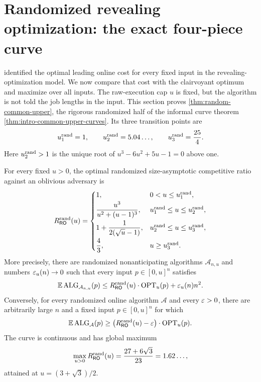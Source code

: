 \section{Randomized revealing optimization: the exact four-piece curve}
\label{sec:random-common-upper}

 identified the optimal leading online cost
for every fixed input in the revealing-optimization model.  We now compare that cost with the
clairvoyant optimum and maximize over all inputs.  The raw-execution cap $u$
is fixed, but
the algorithm is not told the job lengths in the input.  This section proves
\cref{thm:random-common-upper}, the rigorous randomized half of the informal
curve theorem \cref{thm:intro-common-upper-curves}.  Its three transition
points are
\begin{equation}
 u_{1}^{\mathrm{rand}}=1,
 \qquad
 u_{2}^{\mathrm{rand}}=5.04\ldots,
 \qquad
 u_{3}^{\mathrm{rand}}=\frac{25}{4}.
 \label{eq:rand-transition-points}
\end{equation}
Here $u_{2}^{\mathrm{rand}}>1$ is the unique root of
$u^3-6u^2+5u-1=0$ above one.

\begin{theorem}
\label{thm:random-common-upper}
For every fixed $u>0$, the optimal randomized size-asymptotic competitive
ratio against an oblivious adversary is
\begin{equation}
 R_{\mathsf{RO}}^{\mathrm{rand}}(u)=
 \begin{cases}
  1,&0<u\le u_{1}^{\mathrm{rand}},\\[2pt]
  \displaystyle\frac{u^3}{u^2+(u-1)^3},
    &u_{1}^{\mathrm{rand}}\le u\le u_{2}^{\mathrm{rand}},\\[8pt]
  \displaystyle 1+\frac{1}{2(\sqrt u-1)},
    &u_{2}^{\mathrm{rand}}\le u\le u_{3}^{\mathrm{rand}},\\[8pt]
  \displaystyle\frac43,&u\ge u_{3}^{\mathrm{rand}}.
 \end{cases}
 \label{eq:intro-random-common-upper-curve}
\end{equation}
More precisely, there are randomized nonanticipating algorithms
$\mathcal A_{n,u}$ and numbers $\varepsilon_u(n)\to0$ such that every
input $p\in[0,u]^n$ satisfies
\begin{equation}
 \mathbb{E}\operatorname{ALG}_{\mathcal A_{n,u}}(p)
 \le R_{\mathsf{RO}}^{\mathrm{rand}}(u)\cdot\operatorname{OPT}_u(p)+\varepsilon_u(n)n^2.
 \label{eq:intro-random-common-upper}
\end{equation}
Conversely, for every randomized online algorithm $\mathcal A$ and every
$\varepsilon>0$, there
are arbitrarily large $n$ and a fixed input $p\in[0,u]^n$ for which
\begin{equation}
 \mathbb{E}\operatorname{ALG}_{\mathcal A}(p)
 \ge\bigl(R_{\mathsf{RO}}^{\mathrm{rand}}(u)-\varepsilon\bigr)\cdot\operatorname{OPT}_u(p).
 \label{eq:random-common-upper-lower}
\end{equation}
The curve is continuous and has global maximum
\begin{equation}
 \max_{u>0}R_{\mathsf{RO}}^{\mathrm{rand}}(u)
 =\frac{27+6\sqrt3}{23}
 =1.62\ldots,
 \label{eq:intro-random-common-maximum}
\end{equation}
attained at $u=(3+\sqrt3)/2$.
\end{theorem}

